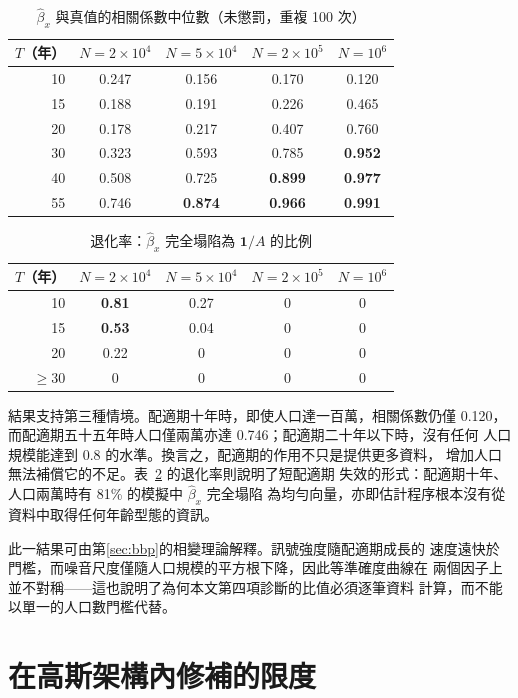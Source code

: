 \documentclass[UTF8, fontset=macnew, a4paper, 12pt]{ctexart}
\begin{document}
\begin{table}[H]
\centering
\caption{$\hat\beta_x$ 與真值的相關係數中位數（未懲罰，重複 100 次）}
\small
\begin{tabular}{rcccc}
\toprule
$T$（年） & $N=2\times10^4$ & $N=5\times10^4$ & $N=2\times10^5$ & $N=10^6$\\
\midrule
10 & 0.247 & 0.156 & 0.170 & 0.120\\
15 & 0.188 & 0.191 & 0.226 & 0.465\\
20 & 0.178 & 0.217 & 0.407 & 0.760\\
30 & 0.323 & 0.593 & 0.785 & \textbf{0.952}\\
40 & 0.508 & 0.725 & \textbf{0.899} & \textbf{0.977}\\
55 & 0.746 & \textbf{0.874} & \textbf{0.966} & \textbf{0.991}\\
\bottomrule
\end{tabular}
\label{tab:TNcor}
\end{table}
\begin{table}[H]
\centering
\caption{退化率：$\hat\beta_x$ 完全塌陷為 $\mathbf{1}/A$ 的比例}
\small
\begin{tabular}{rcccc}
\toprule
$T$（年） & $N=2\times10^4$ & $N=5\times10^4$ & $N=2\times10^5$ & $N=10^6$\\
\midrule
10 & \textbf{0.81} & 0.27 & 0 & 0\\
15 & \textbf{0.53} & 0.04 & 0 & 0\\
20 & 0.22 & 0 & 0 & 0\\
$\ge30$ & 0 & 0 & 0 & 0\\
\bottomrule
\end{tabular}
\label{tab:TNdegen}
\end{table}

結果支持第三種情境。配適期十年時，即使人口達一百萬，相關係數仍僅 0.120，
而配適期五十五年時人口僅兩萬亦達 0.746；配適期二十年以下時，沒有任何
人口規模能達到 0.8 的水準。換言之，配適期的作用不只是提供更多資料，
增加人口無法補償它的不足。表~\ref{tab:TNdegen} 的退化率則說明了短配適期
失效的形式：配適期十年、人口兩萬時有 81\% 的模擬中 $\hat\beta_x$ 完全塌陷
為均勻向量，亦即估計程序根本沒有從資料中取得任何年齡型態的資訊。

此一結果可由第\ref{sec:bbp}的相變理論解釋。訊號強度隨配適期成長的
速度遠快於門檻，而噪音尺度僅隨人口規模的平方根下降，因此等準確度曲線在
兩個因子上並不對稱——這也說明了為何本文第四項診斷的比值必須逐筆資料
計算，而不能以單一的人口數門檻代替。

\section{在高斯架構內修補的限度}\label{sec:limits}
\end{document}
